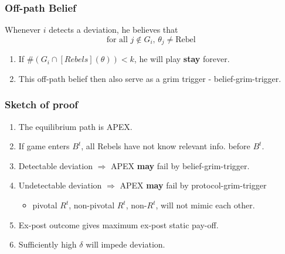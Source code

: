 \documentclass[10pt]{beamer}
\begin{document}
\begin{frame}
\frametitle{Off-path Belief}

Whenever $i$ detects a deviation, he believes that
\[\text{for all $j\notin G_i$, $\theta_j\neq$Rebel  }\]

\begin{enumerate}
\item If $\# (G_i\cap [Rebels](\theta))<k$, he will play \textbf{stay} forever.
\item This off-path belief then also serve as a grim trigger - \alert{belief-grim-trigger}.
\end{enumerate}




\end{frame}


\begin{frame}
\frametitle{Sketch of proof}

\begin{enumerate}
\item The equilibrium path is APEX.
\item If game enters $B^t$, all Rebels have not know relevant info. before $B^t$.
\item Detectable deviation $\Rightarrow$ APEX \textbf{may} fail by belief-grim-trigger.
\item Undetectable deviation $\Rightarrow$ APEX \textbf{may} fail by protocol-grim-trigger
\begin{itemize}
\item pivotal $R^t$, non-pivotal $R^t$, non-$R^t$, will not mimic each other.
\end{itemize}
\item Ex-post outcome gives maximum ex-post static pay-off.
\item Sufficiently high $\delta$ will impede deviation.
\end{enumerate}



\end{frame}
\end{document}
